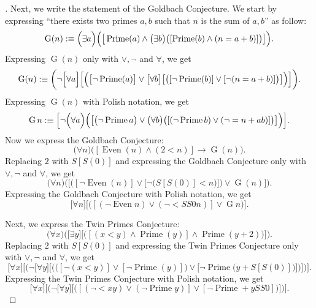 \begin{proof}[]
  Next, we write the statement of the Goldbach Conjecture.
  We start by expressing ``there exists two primes \(a, b\) such that \(n\) is the sum of \(a, b\)'' as follow:
  \[
    \operatorname{G}(n) :\equiv \Big(\exists a\Big)\Big(\big[\operatorname{Prime}(a) \land \big(\exists b\big)\big([\operatorname{Prime}(b) \land (n = a + b)]\big)\big]\Big).
  \]
  Expressing \(\operatorname{G}(n)\) only with \(\lor, \lnot\) and \(\forall\), we get
  \[
    \operatorname{G}(n) :\equiv \bigg(\lnot \Big[\forall a\Big]\Big[\Big(\big[\lnot \operatorname{Prime}(a)\big] \lor \big[\forall b\big]\big[\big([\lnot \operatorname{Prime}(b)] \lor [\lnot (n = a + b)]\big)\big]\Big)\Big]\bigg).
  \]
  Expressing \(\operatorname{G}(n)\) with Polish notation, we get
  \[
    \operatorname{G} n :\equiv \Big[\lnot \Big(\forall a\Big)\Big(\big[\big(\lnot \operatorname{Prime} a\big) \lor \big(\forall b\big)\big([(\lnot \operatorname{Prime} b) \lor (\lnot = n + a b)]\big)\big]\Big)\Big].
  \]
  Now we express the Goldbach Conjecture:
  \[
    \big(\forall n\big)\big([\operatorname{Even}(n) \land (2 < n)] \to \operatorname{G}(n)\big).
  \]
  Replacing \(2\) with \(S[S(0)]\) and expressing the Goldbach Conjecture only with \(\lor, \lnot\) and \(\forall\), we get
  \[
    \bigg(\forall n\bigg)\bigg(\Big[\Big([\lnot \operatorname{Even}(n)] \lor \big[\lnot \big(S[S(0)] < n\big)\big]\Big) \lor \operatorname{G}(n)\Big]\bigg).
  \]
  Expressing the Goldbach Conjecture with Polish notation, we get
  \[
    \big[\forall n\big]\big[\big([(\lnot \operatorname{Even} n) \lor (\lnot < S S 0 n)] \lor \operatorname{G} n\big)\big].
  \]

  Next, we express the Twin Primes Conjecture:
  \[
    \Big(\forall x\Big)\Big(\big[\exists y\big]\big[\big([(x < y) \land \operatorname{Prime}(y)] \land \operatorname{Prime}(y + 2)\big)\big]\Big).
  \]
  Replacing \(2\) with \(S[S(0)]\) and expressing the Twin Primes Conjecture only with \(\lor, \lnot\) and \(\forall\), we get
  \[
    \bigg[\forall x\bigg]\bigg[\bigg(\lnot \Big[\forall y\Big]\Big[\Big(\big([\lnot (x < y)] \lor [\lnot \operatorname{Prime}(y)]\big) \lor \big[\lnot \operatorname{Prime}\big(y + S[S(0)]\big)\big]\Big)\Big]\bigg)\bigg].
  \]
  Expressing the Twin Primes Conjecture with Polish notation, we get
  \[
    \Big[\forall x\Big]\Big[\Big(\lnot \big[\forall y\big]\big[\big([(\lnot < x y) \lor (\lnot \operatorname{Prime} y)] \lor [\lnot \operatorname{Prime} + y S S 0]\big)\big]\Big)\Big].
  \]


\end{proof}
